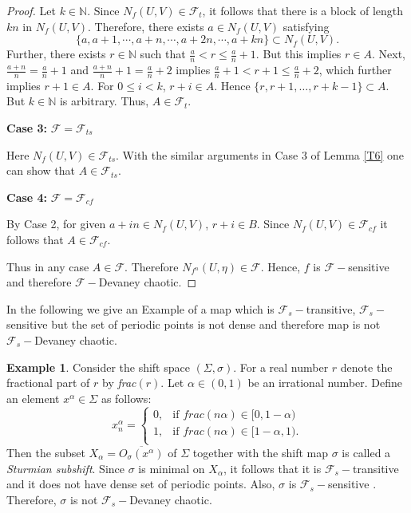 \documentclass{amsart}[12pt, papera4]
\theoremstyle{definition}
\newtheorem{example}[theorem]{Example}
\theoremstyle{remark}
\numberwithin{equation}{section}
\def\N{{\mathbb N}}
\def\F{{\mathscr{F}}}
\begin{document}
\begin{proof}
	\noindent Let $k\in \N$. Since $N_f(U,V)\in \F_t$, it follows that there is a block of length $kn$ in $N_f(U,V)$. Therefore, there exists $a\in N_f(U,V)$ satisfying $$\{a,a+1,\cdots, a+n, \cdots, a+2n,\cdots , a+kn\}\subset N_f(U,V).$$
	Further, there exists $r\in \mathbb{N}$ such that $\frac{\displaystyle{a}}{\displaystyle{n}}< r \leq \frac{\displaystyle{a}}{\displaystyle{n}}+1.$ But this implies $r\in A$. Next, $\frac{\displaystyle{a+n}}{\displaystyle{n}}=\frac{\displaystyle{a}}{\displaystyle{n}}+1$ and $\frac{\displaystyle{a+n}}{\displaystyle{n}}+1=\frac{\displaystyle{a}}{\displaystyle{n}}+2$ implies
	$\frac{\displaystyle{a}}{\displaystyle{n}}+1 < r+1 \leq \frac{\displaystyle{a}}{\displaystyle{n}}+2$, which further implies $r+1\in A$. For $0\leq i<k$, $r+i\in A$. Hence $\{r,r+1,\dots,r+k-1\}\subset A$. But $k\in \N$ is arbitrary. Thus, $A\in \F_t$.
	
	\medskip
	\noindent \textbf{Case 3:} $\F=\F_{ts}$
	
	\noindent Here $N_f(U,V)\in \F_{ts}$. With the similar arguments in Case 3 of Lemma \ref{T6} one can show that $A\in \F_{ts}$. 
	
	
	\medskip
	\noindent \textbf{Case 4:} $\F=\F_{cf}$ 
	
	\noindent By Case 2, for given $a+in\in N_f(U,V)$, $r+i\in B$. Since $N_f(U,V)\in \F_{cf}$ it follows that $A\in \F_{cf}$.
	
	\smallskip
	\noindent Thus in any case $A\in \F$. Therefore $N_{f^n}(U,\eta)\in \F$. Hence, $f$ is $\F-$sensitive and therefore $\F-$Devaney chaotic.
\end{proof}


\medskip
\noindent In the following  we give an Example of a map which is $\F_s-$transitive, $\F_s-$sensitive but the set of periodic points is not dense and therefore map is not $\F_s-$Devaney chaotic.

\smallskip
\begin{example}
	Consider the shift space $(\Sigma,\sigma)$. For a real number $r$ denote the fractional part of $r$ by \emph{frac$(r)$}. Let $\alpha\in (0,1)$ be an irrational number. Define an element $x^{\alpha}\in \Sigma$ as follows: 
	\[ x_n^{\alpha} = \left\{ \begin{array}{lll}
		0, & \mbox{if  $frac(n\alpha)\in[0,1-\alpha)$}\\
		1,  & \mbox{if  $frac(n\alpha)\in[1-\alpha,1)$}.\\
	\end{array}
	\right. \]
	\noindent Then the subset $X_{\alpha}=\overline{O_{\sigma}(x^{\alpha})}$ of $\Sigma$ together with the shift map $\sigma$ is called a \emph{Sturmian subshift}. Since $\sigma$ is minimal on  $X_{\alpha}$, it follows that it is $\F_s-$transitive and it does not have dense set of periodic points. Also, $\sigma$ is $\F_s-$sensitive \cite{TKS}. Therefore, $\sigma$ is not $\F_s-$Devaney chaotic.
\end{example}
\end{document}
